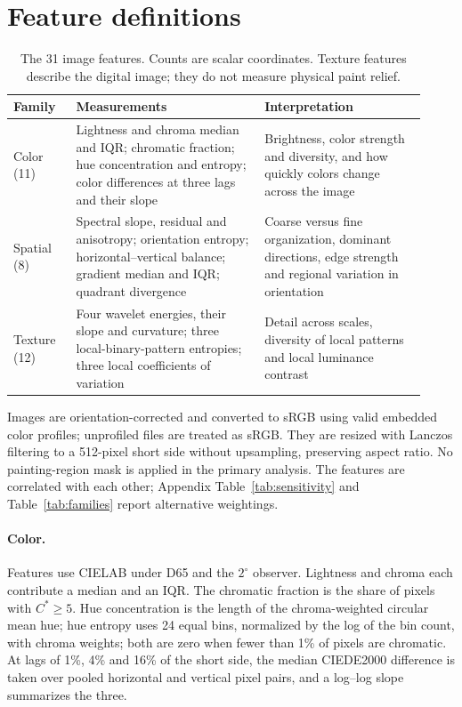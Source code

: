 \FloatBarrier
\section{Feature definitions}\label{app:features}

\begin{table}[ht]
\caption{The 31 image features. Counts are scalar coordinates. Texture features describe the
digital image; they do not measure physical paint relief.}
\label{tab:features}
\vspace{2pt}
\centering\small
\begin{tabular}{@{}p{0.14\linewidth}p{0.42\linewidth}p{0.36\linewidth}@{}}
\toprule
Family & Measurements & Interpretation\\
\midrule
Color (11) & Lightness and chroma median and IQR; chromatic fraction; hue concentration and
entropy; color differences at three lags and their slope & Brightness, color strength and
diversity, and how quickly colors change across the image\\[3pt]
Spatial (8) & Spectral slope, residual and anisotropy; orientation entropy;
horizontal--vertical balance; gradient median and IQR; quadrant divergence & Coarse versus fine
organization, dominant directions, edge strength and regional variation in orientation\\[3pt]
Texture (12) & Four wavelet energies, their slope and curvature; three local-binary-pattern
entropies; three local coefficients of variation & Detail across scales, diversity of local
patterns and local luminance contrast\\
\bottomrule
\end{tabular}
\end{table}

Images are orientation-corrected and converted to sRGB using valid embedded color profiles;
unprofiled files are treated as sRGB. They are resized with Lanczos filtering to a 512-pixel
short side without upsampling, preserving aspect ratio. No painting-region mask is applied in
the primary analysis. The features are correlated with each other; Appendix
Table~\ref{tab:sensitivity} and Table~\ref{tab:families} report alternative weightings.

\paragraph{Color.} Features use CIELAB under D65 and the $2^\circ$ observer. Lightness and
chroma each contribute a median and an IQR. The chromatic fraction is the share of pixels with
$C^*\ge5$. Hue concentration is the length of the chroma-weighted circular mean hue; hue
entropy uses 24 equal bins, normalized by the log of the bin count, with chroma weights; both
are zero when fewer than 1\% of pixels are chromatic. At lags of 1\%, 4\% and 16\% of the short
side, the median CIEDE2000 difference \citep{sharma2005ciede} is taken over pooled horizontal
and vertical pixel pairs, and a log--log slope summarizes the three.

